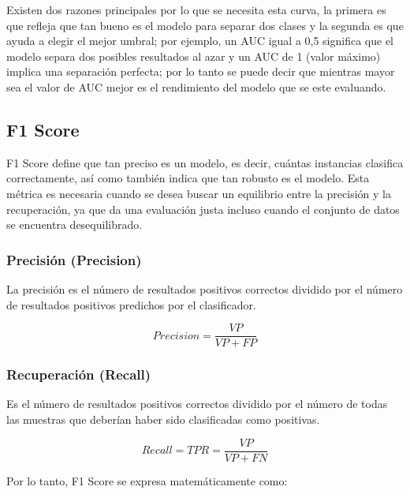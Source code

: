 \vspace{5mm} %

Existen dos razones principales por lo que se necesita esta curva, la primera es que refleja que tan bueno es el modelo para separar dos clases y la segunda es que ayuda a elegir el mejor umbral; por ejemplo, un AUC igual a 0,5 significa que el modelo separa dos posibles resultados al azar y un AUC de 1 (valor m\'{a}ximo) implica una separaci\'{o}n perfecta; por lo tanto se puede decir que mientras mayor sea el valor de AUC mejor es el rendimiento del modelo que se este evaluando.

\subsection{F1 Score}

F1 Score define que tan preciso es un modelo, es decir, cu\'{a}ntas instancias clasifica correctamente, as\'{i} como tambi\'{e}n indica que tan robusto es el modelo. Esta m\'{e}trica es necesaria cuando se desea buscar un equilibrio entre la precisi\'{o}n y la recuperaci\'{o}n, ya que da una evaluaci\'{o}n justa incluso cuando el conjunto de datos se encuentra desequilibrado.

\subsubsection{Precisi\'{o}n (Precision)}

La precisi\'{o}n es el n\'{u}mero de resultados positivos correctos dividido por el n\'{u}mero de resultados positivos predichos por el clasificador.

\begin{equation}
Precision = \frac{VP}{VP+FP}
\end{equation}

\subsubsection{Recuperaci\'{o}n (Recall)}

Es el n\'{u}mero de resultados positivos correctos dividido por el n\'{u}mero de todas las muestras que deber\'{i}an haber sido clasificadas como positivas.

\begin{equation}
Recall = TPR = \frac{VP}{VP+FN}
\end{equation}

Por lo tanto, F1 Score se expresa matem\'{a}ticamente como:


